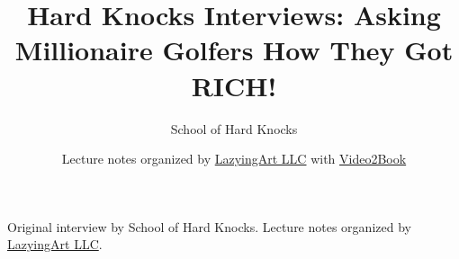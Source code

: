 \documentclass[11pt,oneside]{book}
\begin{document}
\frontmatter
\title{Hard Knocks Interviews: Asking Millionaire Golfers How They Got RICH!}
\author{School of Hard Knocks}
\date{Lecture notes organized by \href{https://lazying.art}{LazyingArt LLC} with \href{https://github.com/lachlanchen/Video2Book}{Video2Book}}
\maketitle
\begin{center}
\small Original interview by School of Hard Knocks. Lecture notes organized by \href{https://lazying.art}{LazyingArt LLC}.
\end{center}
\clearpage
\mainmatter

\end{document}
